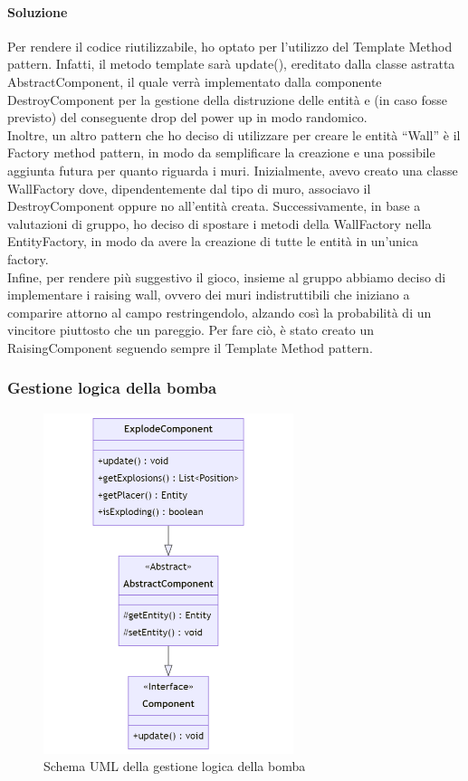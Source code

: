 \documentclass[a4paper,12pt]{report}
\begin{document}
\paragraph{Soluzione} Per rendere il codice riutilizzabile, ho optato per l’utilizzo del Template Method pattern. Infatti, il metodo template sarà update(), ereditato dalla classe astratta AbstractComponent, il quale verrà implementato dalla componente DestroyComponent per la gestione della distruzione delle entità e (in caso fosse previsto) del conseguente drop del power up in modo randomico.
\\
Inoltre, un altro pattern che ho deciso di utilizzare per creare le entità “Wall” è il Factory method pattern, in modo da semplificare la creazione e una possibile aggiunta futura per quanto riguarda i muri. Inizialmente, avevo creato una classe WallFactory dove, dipendentemente dal tipo di muro, associavo il DestroyComponent oppure no all’entità creata. Successivamente, in base a valutazioni di gruppo, ho deciso di spostare i metodi della WallFactory nella EntityFactory, in modo da avere la creazione di tutte le entità in un’unica factory.
\\
Infine, per rendere più suggestivo il gioco, insieme al gruppo abbiamo deciso di implementare i raising wall, ovvero dei muri indistruttibili che iniziano a comparire attorno al campo restringendolo, alzando così la probabilità di un vincitore piuttosto che un pareggio. Per fare ciò, è stato creato un RaisingComponent seguendo sempre il Template Method pattern.


\subsubsection{Gestione logica della bomba}

\begin{figure}[H]
    \centering{}
    \includegraphics[width=0.65\textwidth]{img/UMLGestioneBombe.png}
    \caption{Schema UML della gestione logica della bomba}
    \label{}
\end{figure}
\end{document}
